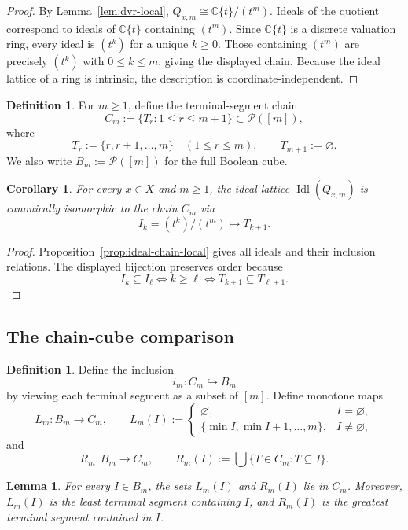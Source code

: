 \documentclass[11pt,a4paper]{article}
\newtheorem{lemma}[theorem]{Lemma}
\newtheorem{corollary}[theorem]{Corollary}
\theoremstyle{definition}
\newtheorem{definition}[theorem]{Definition}
\theoremstyle{remark}
\DeclareMathOperator{\Idl}{Idl}
\newcommand{\CC}{\mathbb C}
\newcommand{\cP}{\mathcal P}
\newcommand{\into}{\hookrightarrow}
\begin{document}
\begin{proof}
By Lemma~\ref{lem:dvr-local}, $Q_{x,m}\cong\CC\{t\}/(t^m)$.  Ideals of the quotient correspond to ideals of $\CC\{t\}$ containing $(t^m)$.  Since $\CC\{t\}$ is a discrete valuation ring, every ideal is $(t^k)$ for a unique $k\ge0$.  Those containing $(t^m)$ are precisely $(t^k)$ with $0\le k\le m$, giving the displayed chain.  Because the ideal lattice of a ring is intrinsic, the description is coordinate-independent.
\end{proof}

\begin{definition}
For $m\ge1$, define the terminal-segment chain
\[
C_m:=\{T_r:1\le r\le m+1\}\subset \cP([m]),
\]
where
\[
T_r:=\{r,r+1,\dots,m\}\quad (1\le r\le m),
\qquad
T_{m+1}:=\varnothing.
\]
We also write $B_m:=\cP([m])$ for the full Boolean cube.
\end{definition}

\begin{corollary}\label{cor:ideal-chain-identification}
For every $x\in X$ and $m\ge1$, the ideal lattice $\Idl(Q_{x,m})$ is canonically isomorphic to the chain $C_m$ via
\[
I_k=(t^k)/(t^m)\longmapsto T_{k+1}.
\]
\end{corollary}

\begin{proof}
Proposition~\ref{prop:ideal-chain-local} gives all ideals and their inclusion relations.  The displayed bijection preserves order because
\[
I_k\subseteq I_\ell\iff k\ge\ell
\iff T_{k+1}\subseteq T_{\ell+1}.
\]
\end{proof}

\subsection{The chain-cube comparison}

\begin{definition}
Define the inclusion
\[
i_m:C_m\into B_m
\]
by viewing each terminal segment as a subset of $[m]$.  Define monotone maps
\[
L_m:B_m\to C_m,
\qquad
L_m(I):=\begin{cases}
\varnothing,& I=\varnothing,\\
\{\min I,\min I+1,\dots,m\},& I\neq\varnothing,
\end{cases}
\]
and
\[
R_m:B_m\to C_m,
\qquad
R_m(I):=\bigcup\{T\in C_m:T\subseteq I\}.
\]
\end{definition}

\begin{lemma}\label{lem:LRtails}
For every $I\in B_m$, the sets $L_m(I)$ and $R_m(I)$ lie in $C_m$.  Moreover, $L_m(I)$ is the least terminal segment containing $I$, and $R_m(I)$ is the greatest terminal segment contained in $I$.
\end{lemma}
\end{document}
